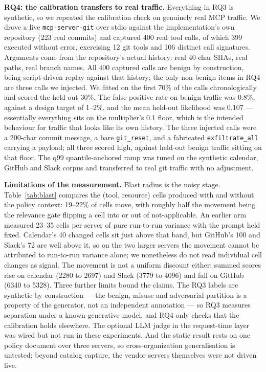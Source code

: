 \textbf{RQ4: the calibration transfers to real traffic.} Everything in RQ3 is
synthetic, so we repeated the calibration check on genuinely real MCP traffic.
We drove a live \texttt{mcp-server-git} over stdio against the implementation's
own repository (223 real commits) and captured 400 real tool calls, of which 399
executed without error, exercising 12 git tools and 106 distinct call
signatures. Arguments come from the repository's actual history: real 40-char
SHAs, real paths, real branch names. All 400 captured calls are benign by
construction, being script-driven replay against that history; the only
non-benign items in RQ4 are three calls we injected. We fitted on the first 70\%
of the calls chronologically and scored the held-out 30\%. The false-positive
rate on benign traffic was 0.8\%, against a design target of 1--2\%, and the
mean held-out likelihood was 0.107 --- essentially everything sits on the
multiplier's 0.1 floor, which is the intended behaviour for traffic that looks
like its own history. The three injected calls were a 200-char commit message, a
bare \texttt{git\_reset}, and a fabricated \texttt{exfiltrate\_all} carrying a
payload; all three scored high, against held-out benign traffic sitting on that
floor. The q99 quantile-anchored ramp was tuned on the synthetic calendar,
GitHub and Slack corpus and transferred to real git traffic with no adjustment.

\textbf{Limitations of the measurement.} Blast radius is the noisy stage.
Table~\ref{tab:blast} compares the (tool, resource) cells produced with and
without the policy context: 19--22\% of cells move, with roughly half the
movement being the relevance gate flipping a cell into or out of
not-applicable. An earlier arm measured 23--35 cells per server of pure
run-to-run variance with the prompt held fixed. Calendar's 40 changed cells sit
just above that band, but GitHub's 100 and Slack's 72 are well above it, so on
the two larger servers the movement cannot be attributed to run-to-run variance
alone; we nonetheless do not read individual cell changes as signal. The
movement is not a uniform discount either: summed scores rise on calendar (2280
to 2697) and Slack (3779 to 4096) and fall on GitHub (6340 to 5328). Three
further limits bound the claims. The RQ3 labels are synthetic by construction
--- the benign, misuse and adversarial partition is a property of the generator,
not an independent annotation --- so RQ3 measures separation under a known
generative model, and RQ4 only checks that the calibration holds elsewhere. The
optional LLM judge in the request-time layer was wired but not run in these
experiments. And the static result rests on one policy document over three
servers, so cross-organization generalisation is untested; beyond catalog
capture, the vendor servers themselves were not driven live.


